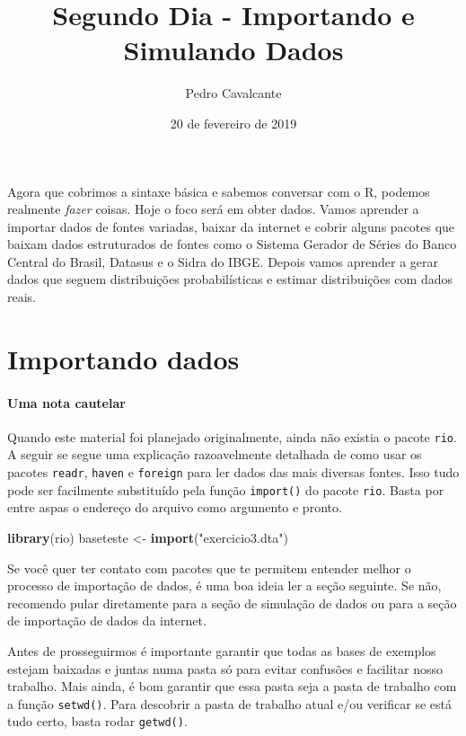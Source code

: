 \documentclass[
]{article}
\title{Segundo Dia - Importando e Simulando Dados}
\author{Pedro Cavalcante}
\date{20 de fevereiro de 2019}
\newenvironment{Shaded}{\begin{snugshade}}{\end{snugshade}}
\newcommand{\KeywordTok}[1]{\textcolor[rgb]{0.13,0.29,0.53}{\textbf{#1}}}
\newcommand{\NormalTok}[1]{#1}
\newcommand{\StringTok}[1]{\textcolor[rgb]{0.31,0.60,0.02}{#1}}
\begin{document}
\maketitle

Agora que cobrimos a sintaxe básica e sabemos conversar com o R, podemos
realmente \emph{fazer} coisas. Hoje o foco será em obter dados. Vamos
aprender a importar dados de fontes variadas, baixar da internet e
cobrir alguns pacotes que baixam dados estruturados de fontes como o
Sistema Gerador de Séries do Banco Central do Brasil, Datasus e o Sidra
do IBGE. Depois vamos aprender a gerar dados que seguem distribuições
probabilísticas e estimar distribuições com dados reais.

\hypertarget{importando-dados}{%
\section{Importando dados}\label{importando-dados}}

\hypertarget{uma-nota-cautelar}{%
\paragraph{Uma nota cautelar}\label{uma-nota-cautelar}}

Quando este material foi planejado originalmente, ainda não existia o
pacote \texttt{rio}. A seguir se segue uma explicação razoavelmente
detalhada de como usar os pacotes \texttt{readr}, \texttt{haven} e
\texttt{foreign} para ler dados das mais diversas fontes. Isso tudo pode
ser facilmente substituído pela função \texttt{import()} do pacote
\texttt{rio}. Basta por entre aspas o endereço do arquivo como argumento
e pronto.

\begin{Shaded}
\begin{Highlighting}[]
\KeywordTok{library}\NormalTok{(rio)}
\NormalTok{baseteste <-}\StringTok{ }\KeywordTok{import}\NormalTok{(}\StringTok{"exercicio3.dta"}\NormalTok{)}
\end{Highlighting}
\end{Shaded}

Se você quer ter contato com pacotes que te permitem entender melhor o
processo de importação de dados, é uma boa ideia ler a seção seguinte.
Se não, recomendo pular diretamente para a seção de simulação de dados
ou para a seção de importação de dados da internet.

Antes de prosseguirmos é importante garantir que todas as bases de
exemplos estejam baixadas e juntas numa pasta só para evitar confusões e
facilitar nosso trabalho. Mais ainda, é bom garantir que essa pasta seja
a pasta de trabalho com a função \texttt{setwd()}. Para descobrir a
pasta de trabalho atual e/ou verificar se está tudo certo, basta rodar
\texttt{getwd()}.
\end{document}
